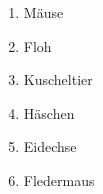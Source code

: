 \documentclass{scrartcl}
\begin{document}
\begin{enumerate}
\item Mäuse
\item Floh
\item Kuscheltier
\item Häschen
\item Eidechse
\item Fledermaus
\end{enumerate}
\end{document}
